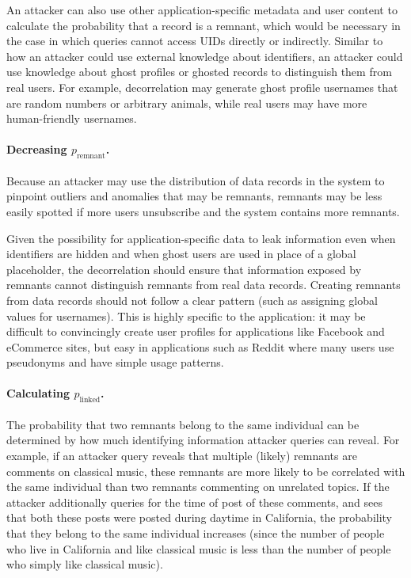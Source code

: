 An attacker can also use other application-specific metadata and user content to calculate the
probability that a record is a remnant, which would be necessary in the case in which queries cannot
access UIDs directly or indirectly. Similar to how an attacker could use external knowledge
about identifiers, an attacker could use knowledge about ghost profiles or ghosted records to
distinguish them from real users.  For example, decorrelation may generate ghost profile usernames
that are random numbers or arbitrary animals, while real users may have more human-friendly
usernames.

\paragraph{Decreasing $p_{\text{remnant}}$.}
Because an attacker may use the distribution of data records in the system to pinpoint outliers and
anomalies that may be remnants, remnants may be less easily spotted if more users unsubscribe and
the system contains more remnants. 

Given the possibility for application-specific data to leak information even when identifiers are
hidden and when ghost users are used in place of a global placeholder, the decorrelation should
ensure that information exposed by remnants cannot distinguish remnants from real data records.
Creating remnants from data records should not follow a clear pattern (such as assigning global
values for usernames).  This is highly specific to the application: it may be difficult to
convincingly create user profiles for applications like Facebook and eCommerce sites, but easy in
applications such as Reddit where many users use pseudonyms and have simple usage patterns.

\paragraph{Calculating $p_{\text{linked}}$.}
The probability that two remnants belong to the same individual can be determined by how much
identifying information attacker queries can reveal.
For example, if an attacker query reveals that multiple
(likely) remnants are comments on classical music, these remnants are more likely to be
correlated with the same individual than two remnants commenting on unrelated topics. If the
attacker additionally queries for the time of post of these comments, and sees that both these posts
were posted during daytime in California, the probability that they belong to the same individual
increases (since the number of people who live in California and like classical music is less than
the number of people who simply like classical music).

